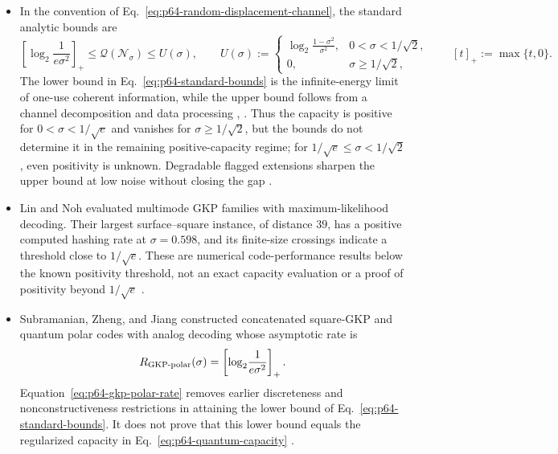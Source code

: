\begin{itemize}
  \item In the convention of
  Eq.~\eqref{eq:p64-random-displacement-channel}, the standard analytic bounds
  are
  \begin{equation}
    \left[\log_2\!\frac{1}{e\sigma^2}\right]_+
    \leq \mathcal Q(\mathcal N_\sigma)
    \leq U(\sigma),
    \qquad
    U(\sigma):=
    \begin{cases}
      \displaystyle\log_2\!\frac{1-\sigma^2}{\sigma^2},
        &0<\sigma<1/\sqrt2,\\[1mm]
      0,&\sigma\geq1/\sqrt2,
    \end{cases}
    \qquad [t]_+:=\max\{t,0\}.
    \label{eq:p64-standard-bounds}
  \end{equation}
  The lower bound in Eq.~\eqref{eq:p64-standard-bounds} is the infinite-energy
  limit of one-use coherent information, while the upper bound follows from a
  channel decomposition and data processing
  ,
  .  Thus the capacity is positive
  for $0<\sigma<1/\sqrt e$ and vanishes for
  $\sigma\geq1/\sqrt2$, but the bounds do not determine it in the remaining
  positive-capacity regime; for
  $1/\sqrt e\leq\sigma<1/\sqrt2$, even positivity is unknown.  Degradable
  flagged extensions sharpen the upper bound at low noise without closing the
  gap .

  \item Lin and Noh evaluated multimode GKP families with maximum-likelihood
  decoding.  Their largest surface--square instance, of distance $39$, has a
  positive computed hashing rate at $\sigma=0.598$, and its finite-size
  crossings indicate a threshold close to $1/\sqrt e$.  These are numerical
  code-performance results below the known positivity threshold, not an exact
  capacity evaluation or a proof of positivity beyond $1/\sqrt e$
  .

  \item Subramanian, Zheng, and Jiang constructed concatenated square-GKP and
  quantum polar codes with analog decoding whose asymptotic rate is
  \begin{equation}
    R_{\rm GKP\text{-}polar}(\sigma)
    =\left[\log_2\!\frac{1}{e\sigma^2}\right]_+.
    \label{eq:p64-gkp-polar-rate}
  \end{equation}
  Equation~\eqref{eq:p64-gkp-polar-rate} removes earlier discreteness and
  nonconstructiveness restrictions in attaining the lower bound of
  Eq.~\eqref{eq:p64-standard-bounds}.  It does not prove that this lower bound
  equals the regularized capacity in Eq.~\eqref{eq:p64-quantum-capacity}
  .
\end{itemize}

